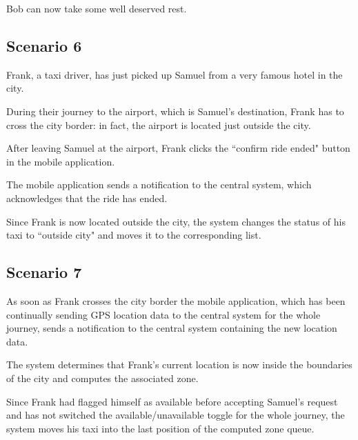 Bob can now take some well deserved rest.


\subsection{Scenario 6}
Frank, a taxi driver, has just picked up Samuel from a very famous hotel in the city.

During their journey to the airport, which is Samuel's destination, Frank has to cross the city border: in fact, the airport is located just outside the city.

After leaving Samuel at the airport, Frank clicks the ``confirm ride ended" button in the mobile application.

The mobile application sends a notification to the central system, which acknowledges that the ride has ended. 

Since Frank is now located outside the city, the system changes the status of his taxi to ``outside city" and moves it to the corresponding list.


\subsection{Scenario 7}
As soon as Frank crosses the city border the mobile application, which has been continually sending GPS location data to the central system for the whole journey, sends a notification to the central system containing the new location data.

The system determines that Frank's current location is now inside the boundaries of the city and computes the associated zone.

Since Frank had flagged himself as available before accepting Samuel's request and has not switched the available/unavailable toggle for the whole journey, the system moves his taxi into the last position of the computed zone queue.